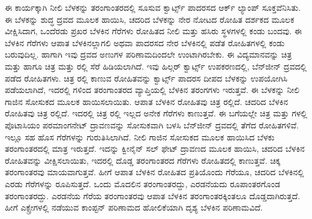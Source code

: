 ಈ ಕಾರ್ಯಕ್ಕಾಗಿ ನೀಲಿ ಬೆಳಕನ್ನು  ತರಂಗಾಂತರದಲ್ಲಿ ಸೂಸುವ ಕ್ವಾರ್ಟ್ಸ್ ಪಾದರಸದ ಆರ್ಕ್ ಲ್ಯಾಂಪ್ ಸೂಕ್ತವೆನಿಸಿತು. ಈ ಬೆಳಕನ್ನು ಶುದ್ಧ ದ್ರವದ ಮೂಲಕ ಹಾಯಿಸಿ, ಚದರಿದ ಬೆಳಕನ್ನು ನೇರ ನೋಟದ ರೋಹಿತ ದರ್ಶಕದ ಮೂಲಕ ವೀಕ್ಷಿಸಿದಾಗ, ಒಂದೆರಡು ಪ್ರಖರ ಬೆಳಕಿನ ಗೆರೆಗಳು ರೋಹಿತದ ನೀಲಿ ಮತ್ತು ಹಸಿರು ಸ್ಥಳಗಳಲ್ಲಿ ಕಂಡು ಬಂದವು. ಈ ಬೆಳಕಿನ ಗೆರೆಗಳು ಆಪಾತ ಬೆಳಕಿನಲ್ಲಾಗಲಿ ಅಥವಾ ಪಾದರಸದ ನೇರ ಬೆಳಕಿನಲ್ಲಿ ಪಡೆತ ರೋಹಿತಗಳಲ್ಲಿ ಕಂಡು ಬರುವುದಿಲ್ಲ. ಹಾಗಾಗಿ ಇವು ದ್ರವದ ಅಣುಗಳ ಪರಿಣಾಮದಿಂದಲೇ ಉಂಟಾಗಿರಬೇಕು. ಈ ವಿದ್ಯಮಾನವನ್ನು ಚಿತ್ರ  ಮತ್ತು  ಹಾಗೂ ಚಿತ್ರ  ಮತ್ತು ರಲ್ಲಿ ಸೆರೆ ಹಿಡಿಯಲಾಗಿದೆ. ಇವು ಹಿಲ್ಗರ್ ಕ್ವಾರ್ಟ್ಸ್ ಉಪಕರಣದಲ್ಲಿ, ಬೆನ್‍ಜೀನ್ ದ್ರವದಲ್ಲಿ ಪಡೆದ ರೋಹಿತಗಳು. ಚಿತ್ರ ರಲ್ಲಿ ಕಾಣುವ ರೋಹಿತವನ್ನು ಕ್ವಾರ್ಟ್ಸ್ ಪಾದರಸ ದೀಪದ ಬೆಳಕನ್ನು ಉಪಯೋಗಿಸಿ ಪಡೆಯಲಾಗಿದೆ, ಇದರಲ್ಲಿ  ಗಳಿಂದ  ತರಂಗಾಂತರದ ವ್ಯಾಪ್ತಿಯಲ್ಲಿ ಬೆಳಕಿನ ತರಂಗಗಳು ಇರುತ್ತವೆ. ಈ ಬೆಳಕನ್ನು ನೀಲಿ ಗಾಜಿನ ಸೋಸುಕದ ಮೂಲಕ ಹಾಯಿಸಲಾಯಿತು. ಆಪಾತ ಬೆಳಕಿನ ರೋಹಿತವು ಚಿತ್ರ ರಲ್ಲಿದೆ. ಚದರಿದ ಬೆಳಕಿನ ರೋಹಿತವು ಚಿತ್ರ ರಲ್ಲಿದೆ. ಇದರಲ್ಲಿ ಚಿತ್ರ ರಲ್ಲಿ ಇಲ್ಲದ ಅನೇಕ ಗೆರೆಗಳು ಕಾಣುತ್ತವೆ. ಈ ಬಗೆಯಲ್ಲೇ ಚಿತ್ರ  ಮತ್ತು  ಗಳಲ್ಲಿ ಪೊಟಾಸಿಯಂ ಪರಮಾಂಗನೇಟ್ ದ್ರಾವಣವನ್ನು ಸೋಸುಕವಾಗಿ ಬಳಸಿ ಬೆನ್‍ಜೀನ್ ದ್ರವದಲ್ಲಿ ತೆಗೆದ ರೋಹಿತಗಳಿವೆ. ಇಲ್ಲೂ ಸಹ ಹೊಸ ಗೆರೆಗಳನ್ನು ಗುರುತಿಸಿಲಾಗಿದೆ. ನೀಲಿ ಗಾಜಿನ ಸೋಸುಕದ ಮೂಲಕ ಹಾಯಿಸಿದ ಬೆಳಕು  ತರಂಗಾಂತರದಲ್ಲಿ ಮಾತ್ರ ಇರುತ್ತದೆ. ಇದನ್ನು ಕ್ವೀನೈನ್ ಸಲ್ ಫೇಟ್ ದ್ರಾವಣದ ಮೂಲಕ ಹಾಯಿಸಿ, ಚದರಿದ ಬೆಳಕಿನ ರೋಹಿತವನ್ನು ವೀಕ್ಷಿಸಲಾಯಿತು, ಇದರಲ್ಲಿ ದೊಡ್ಡ ತರಂಗಾಂತರದ ಗೆರೆಗಳು ರೋಹಿತದಲ್ಲಿ ಕಾಣುತ್ತವೆ. ಚಿಕ್ಕ ತರಂಗಾಂತರವು ಮಾಯವಾಗುತ್ತವೆ. ಹೀಗೆ ಆಪಾತ ಬೆಳಕಿನ ರೋಹಿತದ ಪ್ರತಿಯೊಂದು ಗೆರೆಯೂ, ಚದರಿದ ಬೆಳಕಿನಲ್ಲಿ ಎರಡು ಗೆರೆಗಳನ್ನು ರೂಪಿಸುತ್ತದೆ. ಒಂದು ಮೊದಲಿನ ತರಂಗಾಂತರದ್ದು, ಎರಡನೆಯದು ರೂಪಾಂತರಗೊಂಡ ತರಂಗಾಂತರದ್ದು. ಎರಡನೆಯ ಗೆರೆಯ ತರಂಗಾಂತರವು ಆಪಾತ ಬೆಳಕಿನ ತರಂಗಾಂತರಕ್ಕಿಂತಲೂ ದೊಡ್ಡದಾಗಿರುತ್ತದೆ. ಹೀಗೆ ಎಕ್ಸ್\enginline{-}ರೇಗಳಲ್ಲಿ ನಡೆಯುವ ಕಾಂಪ್ಟನ್ ಪರಿಣಾಮದ ಹೋಲಿಕೆಯಾಗಿ ದೃಶ್ಯ ಬೆಳಕಿನ ಪರಿಣಾಮವಿದೆ.

